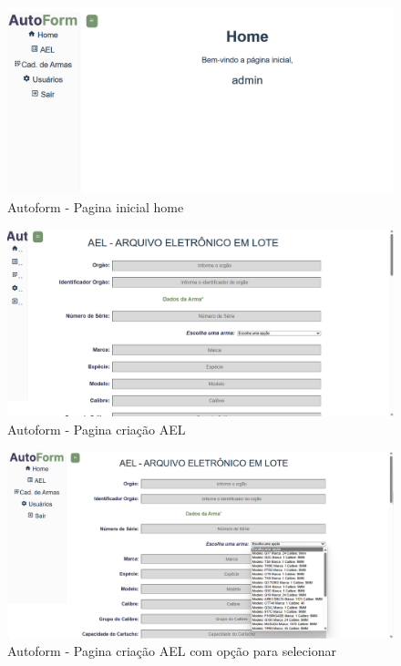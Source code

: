 \begin{figure}[htb]
    \caption{\label{fig:tela-home}Autoform - Pagina inicial home}
    \begin{center}
        \includegraphics[scale=0.5]{imagens/home-autoform.png}
    \end{center}
\end{figure}

\begin{figure}[htb]
    \caption{\label{fig:tela-ael1}Autoform - Pagina criação AEL}
    \begin{center}
        \includegraphics[scale=0.5]{imagens/autoform-ael-gerar.png}
    \end{center}
\end{figure}

\begin{figure}[htb]
    \caption{\label{fig:tela-ael1}Autoform - Pagina criação AEL com opção para selecionar}
    \begin{center}
        \includegraphics[scale=0.5]{imagens/autoform-ael-selecao.png}
    \end{center}
\end{figure}

